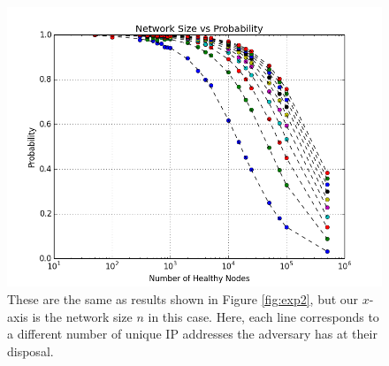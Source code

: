 \documentclass[11pt,conference]{IEEEtran}
\begin{document}
\begin{figure}
\centering
\includegraphics[width=\linewidth]{size_prob_all}
\caption[a]{These are the same as results shown in Figure \ref{fig:exp2}, but our $x$-axis is the network size $n$ in this case.  
    Here, each line corresponds to a different number of unique IP addresses the adversary has at their disposal.}
\label{fig:size_prob_all}
\end{figure}
\end{document}
